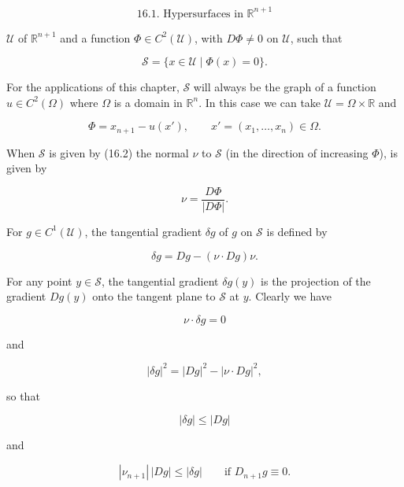 
\[
\text{16.1. Hypersurfaces in } \mathbb R^{n+1}
\]

$\mathcal U$ of $\mathbb R^{n+1}$ and a function $\Phi \in C^2(\mathcal U)$, with $D\Phi \neq 0$ on $\mathcal U$, such that

\begin{equation}
\tag{16.2}
\mathcal S = \{x \in \mathcal U \mid \Phi(x)=0\}.
\end{equation}

For the applications of this chapter, $\mathcal S$ will always be the graph of a function
$u \in C^2(\Omega)$ where $\Omega$ is a domain in $\mathbb R^n$. In this case we can take $\mathcal U = \Omega \times \mathbb R$ and

\begin{equation}
\tag{16.3}
\Phi = x_{n+1} - u(x'), \qquad x' = (x_1, \ldots, x_n) \in \Omega.
\end{equation}

When $\mathcal S$ is given by (16.2) the normal $\nu$ to $\mathcal S$ (in the direction of increasing $\Phi$),
is given by

\[
\nu = \frac{D\Phi}{|D\Phi|}.
\]

For $g \in C^1(\mathcal U)$, the tangential gradient $\delta g$ of $g$ on $\mathcal S$ is defined by

\begin{equation}
\tag{16.4}
\delta g = Dg - (\nu \cdot Dg)\nu.
\end{equation}

For any point $y \in \mathcal S$, the tangential gradient $\delta g(y)$ is the projection of the gradient
$Dg(y)$ onto the tangent plane to $\mathcal S$ at $y$. Clearly we have

\begin{equation}
\tag{16.5}
\nu \cdot \delta g = 0
\end{equation}

and

\begin{equation}
\tag{16.6}
|\delta g|^2 = |Dg|^2 - |\nu \cdot Dg|^2,
\end{equation}

so that

\begin{equation}
\tag{16.7}
|\delta g| \le |Dg|
\end{equation}

and

\begin{equation}
\tag{16.8}
|\nu_{n+1}|\,|Dg| \le |\delta g| \qquad \text{if } D_{n+1}g \equiv 0.
\end{equation}

